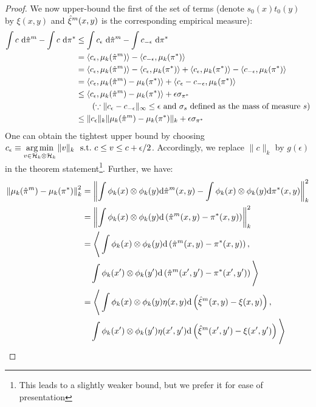 \begin{proof}
We now upper-bound the first of the set of terms (denote $s_0(x)t_0(y)$ by $\xi(x,y)$ and $\hat{\xi}^m(x,y)$ is the corresponding empirical measure):
\begin{align*}
        \int c~\textup{d}\hat{\pi}^m-\int c~\textup{d}\pi^*&\le\int c_\epsilon~\textup{d}\hatpi^m-\int c_{-\epsilon}~\textup{d}\pi^*\\
        &=\langle c_\epsilon,\mu_k(\hatpi^m)\rangle-\langle c_{-\epsilon},\mu_k(\pi^*)\rangle\\
        &=\langle c_\epsilon,\mu_k(\hatpi^m)\rangle-\langle c_\epsilon,\mu_k(\pi^*)\rangle+\langle c_\epsilon,\mu_k(\pi^*)\rangle-\langle c_{-\epsilon},\mu_k(\pi^*)\rangle\\
        &=\langle c_\epsilon,\mu_k(\hatpi^m)-\mu_k(\pi^*)\rangle+\langle c_\epsilon-c_{-\epsilon},\mu_k(\pi^*)\rangle\\
        &\le \langle c_\epsilon,\mu_k(\hatpi^m)-\mu_k(\pi^*)\rangle + \epsilon\sigma_{\pi^*}\\
        &\tag{$\because \|c_\epsilon-c_{-\epsilon}\|_\infty\le\epsilon$ and $\sigma_{s}$ defined as the mass of measure $s$}\\
    & \le\|c_\epsilon\|_k\|\mu_k(\hatpi^m)-\mu_k(\pi^*)\|_k + \epsilon\sigma_{\pi^*}
\end{align*}
One can obtain the tightest upper bound by choosing $c_\epsilon\equiv\argmin_{v\in\calH_k\otimes\calH_k}\|v\|_k\ \ \textup{s.t.}\ c\le v\le c+\epsilon/2$. Accordingly, we replace $\|c\|_k$ by $g(\epsilon)$ in the theorem statement\footnote{This leads to a slightly weaker bound, but we prefer it for ease of presentation}.
Further, we have:
\allowdisplaybreaks
\begin{align*}
    \left\|\mu_k(\hat{\pi}^m)-\mu_k(\pi^*)\right\|_k^2
    &=\left\|\int\phi_k(x)\otimes\phi_k(y)\textup{d}\hat{\pi}^m(x,y)-\int\phi_k(x)\otimes\phi_k(y)\textup{d}\pi^*(x,y)\right\|_k^2\\
    &=\left\|\int\phi_k(x)\otimes\phi_k(y)\textup{d}\left(\hat{\pi}^m(x,y)-\pi^*(x,y)\right)\right\|_k^2\\
    &=\Bigg<\int\phi_k(x)\otimes\phi_k(y)\textup{d}\left(\hat{\pi}^m(x,y)-\pi^*(x,y)\right),\\
    &\quad\int\phi_k(x')\otimes\phi_k(y')\textup{d}\left(\hat{\pi}^m(x',y')-\pi^*(x',y')\right)\Bigg>\\
    &=\Bigg<\int\phi_k(x)\otimes\phi_k(y)\eta(x,y)\textup{d}\left(\hatxi^m(x,y)-\xi(x,y)\right),\\
    &\quad\int\phi_k(x')\otimes\phi_k(y')\eta(x',y')\textup{d}\left(\hatxi^m(x',y')-\xi(x',y')\right)\Bigg>\\

\end{align*}
\end{proof}
